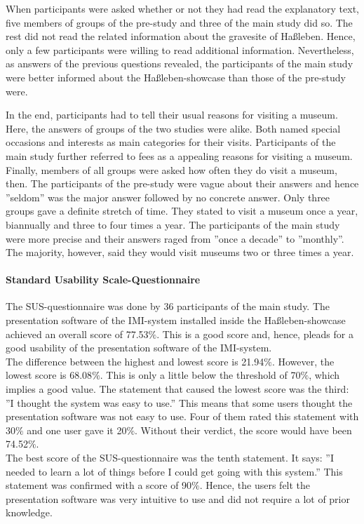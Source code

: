 When participants were asked whether or not they had read the explanatory text, five members of groups of the pre-study and three of the main study did so. The rest did not read the related information about the gravesite of Haßleben. Hence, only a few participants were willing to read additional information. Nevertheless, as answers of the previous questions revealed, the participants of the main study were better informed about the Haßleben-showcase than those of the pre-study were.  

In the end, participants had to tell their usual reasons for visiting a museum. Here, the answers of groups of the two studies were alike. Both named special occasions and interests as main categories for their visits. Participants of the main study further referred to fees as a appealing reasons for visiting a museum.
\\
Finally, members of all groups were asked how often they do visit a museum, then. The participants of the pre-study were vague about their answers and hence ''seldom'' was the major answer followed by no concrete answer. Only three groups gave a definite stretch of time. They stated to visit a museum once a year, biannually and three to four times a year. The participants of the main study were more precise and their answers raged from ''once a decade'' to ''monthly''. The majority, however, said they would visit museums two or three times a year.


\paragraph{Standard Usability Scale-Questionnaire} The \ac{SUS}-questionnaire was done by 36 participants of the main study. The presentation software of the \ac{IMI}-system installed inside the Haßleben-showcase achieved an overall score of 77.53$\%$. This is a good score and, hence, pleads for a good usability of the presentation software of the \ac{IMI}-system.
\\
The difference between the highest and lowest score is 21.94$\%$. However, the lowest score is 68.08$\%$. This is only a little below the threshold of 70$\%$, which implies a good value. The statement that caused the lowest score was the third: ''I thought the system was easy to use.'' This means that some users thought the presentation software was not easy to use. Four of them rated this statement with 30$\%$ and one user gave it 20$\%$. Without their verdict, the score would have been 74.52$\%$. 
\\
The best score of the \ac{SUS}-questionnaire was the tenth statement. It says: ''I needed to learn a lot of things before I could get going with this system.'' This statement was confirmed with a score of 90$\%$. Hence, the users felt the presentation software was very intuitive to use and did not require a lot of prior knowledge.

